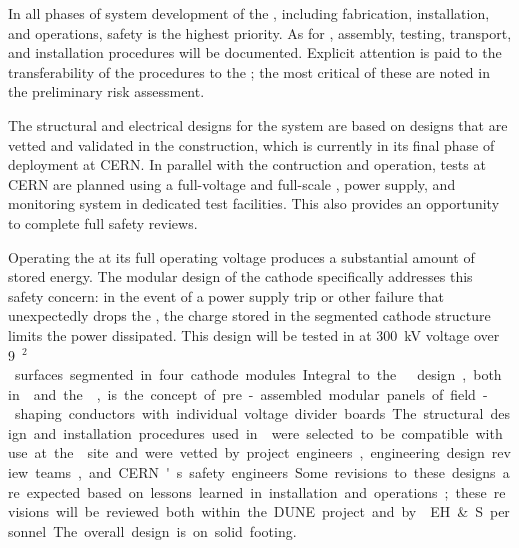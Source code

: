 %

%

In all phases of  system development of the \dpmod, including fabrication, installation, and operations, safety is the highest priority.  %
As for , assembly, testing, transport, and installation procedures will be documented. Explicit attention is paid to the transferability of the  procedures to the \dpmod; the most critical of these are noted in the preliminary  risk assessment. 

The structural and electrical designs for the   system are based on designs that are vetted and validated in the  construction, which is currently in its final phase of deployment at CERN. In parallel with the  contruction and operation,   tests at CERN are planned using %
a full-voltage and full-scale  \fdth, power supply, and monitoring system in dedicated  test facilities. This also provides an opportunity %
to complete full safety reviews. 

Operating the  at its full operating voltage produces a substantial amount of stored energy. The modular design of the cathode specifically addresses this safety concern: in the event of a power supply trip or other failure that unexpectedly drops the , the charge stored in the segmented cathode structure limits the power dissipated. 
This design will be tested in  at \SI{300}{kV} voltage over \SI{9}{\m$^2$} surfaces segmented in four cathode modules.  

Integral to the   design, both in  and the \dpmod, is the concept of pre-assembled modular panels of field-shaping conductors with individual voltage divider boards. The structural design and installation procedures used in  were selected to be compatible with use at the  site and were vetted by project engineers, engineering design review teams, and CERN's safety engineers. Some revisions to these designs are expected based on lessons learned in installation and operations; these revisions will be reviewed both within the DUNE project and by \fnal EH\&S personnel. The overall design is on solid footing. 

